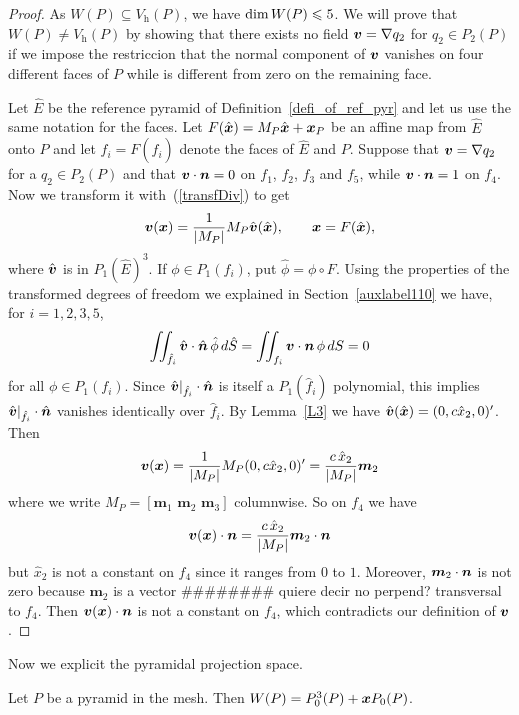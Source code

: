 \begin{proof}
As $W(P)\subseteq V_{\textit{h}}(P)$, we have $\mbox{dim\,}W(P)\leqslant 5$. 
We will prove that $W(P)\ne V_{\textit{h}}(P)$ by showing that there exists no field
$\boldsymbol{v}=\nabla q_2$ for $q_2\in P_2(P)$ if we impose the restriccion that the normal
component of $\boldsymbol{v}$ vanishes on four different faces of $P$ while is different from zero on
the remaining face.

Let $\hat E$ be the reference pyramid of Definition~\ref{defi_of_ref_pyr}  and
let us use the same notation for the faces. Let $F(\hat {\boldsymbol{x}}) = M_P \hat{\boldsymbol{x}} + \boldsymbol{x}_P$
be an affine map from $\hat E$ onto $P$ and let
$f_i=F(\hat f_i)$ denote the faces of $\hat E$ and $P$. Suppose
that $\boldsymbol{v}=\nabla q_2$ for a $q_2 \in P_2(P)$ and that
$\boldsymbol{v}\cdot\boldsymbol{n}=0$ on $f_1$, $f_2$, $f_3$ and $f_5$, while
$\boldsymbol{v}\cdot\boldsymbol{n}=1$ on $f_4$. Now we transform it with~(\ref{transfDiv}) to get
\begin{equation}\label{piola}
\boldsymbol{v}({\boldsymbol{x}}) = \frac1{|M_P|}M_P\hat{\boldsymbol{v}}(\hat{\boldsymbol{x}}), \qquad {\boldsymbol{x}}=F(\hat {\boldsymbol{x}}),
\end{equation}
where $\hat{\boldsymbol{v}}$ is in $P_1(\hat E)^3$. If $\phi\in P_1(f_i)$, put $\hat\phi = \phi\circ F$.
Using the properties of the transformed
degrees of freedom we explained in Section~\ref{auxlabel110} we have, for $i=1,2,3,5$,
\[
\iint_{\hat f_i}\hat{\boldsymbol{v}}\cdot {\hat{\boldsymbol{n}}}\,\hat\phi\,d\hat S = \iint_{f_i}\boldsymbol{v}\cdot {\boldsymbol{n}}\,\phi\,dS =0
\]
for all $\phi\in P_1(f_i)$.
Since $\hat{\boldsymbol{v}}|_{\hat f_i}\cdot {\hat{\boldsymbol{n}}}$ is itself a $P_1(\hat f_i)$ polynomial, 
this implies $\hat{\boldsymbol{v}}|_{\hat f_i}\cdot {\hat{\boldsymbol{n}}}$ vanishes identically over $\hat f_i$.
By Lemma~\ref{L3} we have $\hat{\boldsymbol{v}}(\hat{\boldsymbol{x}})=(0,c\hat x_2,0)'$. Then
\[
  \boldsymbol{v}({\boldsymbol{x}})=\frac1{|M_P|}M_P(0,c\hat x_2,0)' = \frac {c\,\hat x_2}{|M_P|}\boldsymbol{m}_2 
\]
where we write $M_P=[\boldsymbol{m}_1\,\,\boldsymbol{m}_2\,\,\boldsymbol{m}_3]$ 
columnwise. So on $f_4$ we have 
\[
	\boldsymbol{v}({\boldsymbol{x}})\cdot {\boldsymbol{n}}=\frac {c\,\hat x_2}{|M_P|}\boldsymbol{m}_2\cdot {\boldsymbol{n}} 
\]
but $\hat x_2$ is not a constant on $f_4$ since it ranges from $0$ to $1$. Moreover,
$\boldsymbol{m}_2\cdot {\boldsymbol{n}}$ is not zero because $\boldsymbol{m}_2$ is a 
vector {\color{Orange}\#\#\#\#\#\#\#\# quiere decir no perpend? transversal} to $f_4$.
Then $\boldsymbol{v}({\boldsymbol{x}})\cdot {\boldsymbol{n}}$ is not a constant on $f_4$, which contradicts our 
definition of $\boldsymbol{v}$.  
\end{proof}
Now we explicit the pyramidal projection space.
\begin{proposition}
Let $P$ be a pyramid in the mesh. Then $W(P)=P_0^3(P)+{\boldsymbol{x}} P_0(P)$.
\end{proposition}
